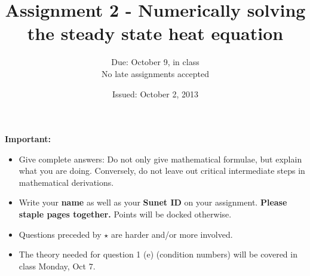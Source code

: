 \documentclass{article}
\title{Assignment 2 - Numerically solving the steady state heat equation}
\date{Issued: October 2, 2013}
\author{Due: October 9, in class\\
No late assignments accepted}
\begin{document}
\maketitle
\thispagestyle{fancy}
\textbf{Important:}
\begin{itemize}
\item Give complete answers: Do not only give mathematical formulae, but explain what you are doing. Conversely, do not leave out critical intermediate steps in mathematical derivations.
\item Write your \textbf{name} as well as your \textbf{Sunet ID} on your assignment. \textbf{Please staple pages together.} Points will be docked otherwise.
\item Questions preceded by  $\star$  are harder and/or more involved.
\item The theory needed for question 1 (e) (condition numbers) will be covered in class Monday, Oct $7$. 
\end{itemize}
\end{document}
